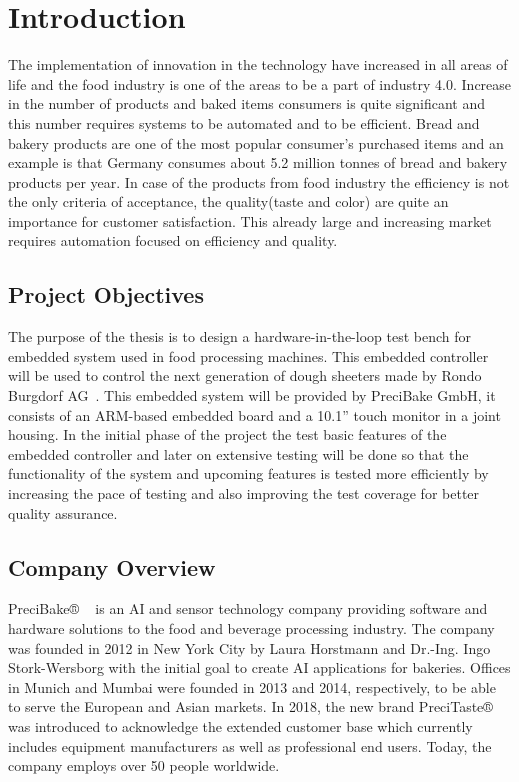\documentclass{listhesis}
\begin{document}
\chapter{Introduction}
The implementation of innovation in the technology have increased in all areas of life and the food industry is one of the areas to be a part of industry 4.0. Increase in the number of products and baked items consumers is quite significant and this number requires systems to be automated and to be efficient. Bread and bakery products are one of the most popular consumer's purchased items and an example is that Germany consumes about 5.2 million tonnes of bread and bakery products per year. In case of the products from food industry the efficiency is not the only criteria of acceptance, the quality(taste and color) are quite an importance for customer satisfaction. This already large and increasing market requires automation focused on efficiency and quality.


\section{Project Objectives}
The purpose of the thesis is to design a hardware-in-the-loop test bench for embedded system used in food processing machines. This embedded controller will be used to control the next generation of dough sheeters made by Rondo Burgdorf AG~\cite{rondo}. This embedded system will be provided by PreciBake GmbH, it consists of an ARM-based embedded board and a 10.1” touch monitor in a joint housing. In the initial phase of the project the test basic features of the embedded controller and later on extensive testing will be done so that the functionality of the system and upcoming features is tested more efficiently by increasing the pace of testing and also improving the test coverage for better quality assurance. 
 \\

\section{Company Overview}
PreciBake® ~\cite{precibake} is an AI and sensor technology company providing software and hardware solutions to the food and beverage processing industry. The company was founded in 2012 in New York City by Laura Horstmann and Dr.-Ing. Ingo Stork-Wersborg with the initial goal to create AI applications for bakeries. Offices in Munich and Mumbai were founded in 2013 and 2014, respectively, to be able to serve the European and Asian markets. In 2018, the new brand PreciTaste®~\cite{precitaste} was introduced to acknowledge the extended customer base which currently includes equipment manufacturers as well as professional end users. Today, the company employs over 50 people worldwide. 
\end{document}
